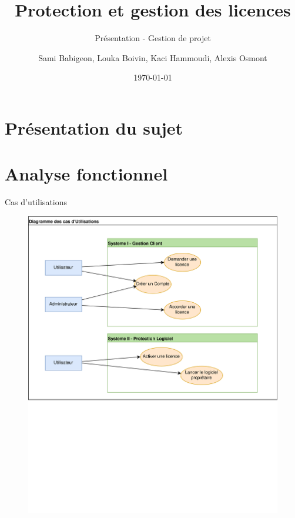 \documentclass{cubeamer}
\title{Protection et gestion des licences}
\subtitle{Présentation - Gestion de projet}
\author{Sami Babigeon, Louka Boivin, Kaci Hammoudi, Alexis Osmont}
\date{\today}
\institute[Université de Rouen]{Master Informatique - 1ère année}
\begin{document}
\maketitle

\cutoc

%
%

\section{Présentation du sujet}

\section{Analyse fonctionnel}

\begin{frame}{Cas d'utilisations}
    \begin{figure}
        \centering
        \includegraphics[scale=0.5]{img/Util.png}
    \end{figure}
\end{frame}
\end{document}
